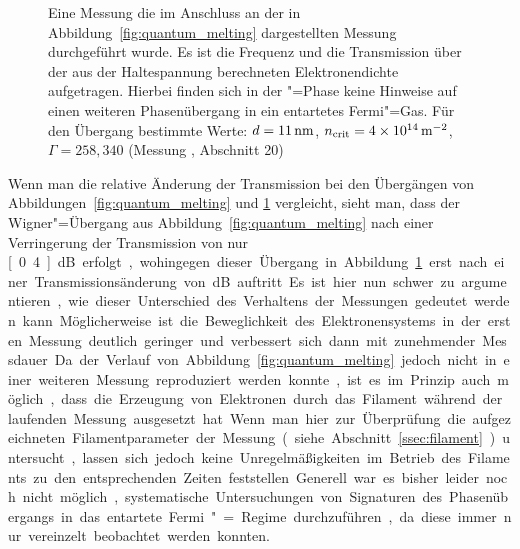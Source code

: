 \begin{figure}[h!tbp]
    \hfill%
    \begin{minipage}[b]{\textwidth-\midwidth-\tabcolsep}
        \caption[Hohe Elektronendichten auf \SiO, Dichteverlauf]{Eine Messung die im Anschluss an der in Abbildung~\ref{fig:quantum_melting} dargestellten Messung durchgeführt wurde. Es ist die Frequenz und die Transmission über der aus der Haltespannung berechneten Elektronendichte aufgetragen. Hierbei finden sich in der "=Phase keine Hinweise auf einen weiteren Phasenübergang in ein entartetes Fermi"=Gas. Für den Übergang bestimmte Werte: $d=\unit[11]{nm}$, $n_\text{crit}=\unit[4\times10^{14}]{\Em}$, $\Gamma=258, 340$ (Messung , Abschnitt 20)}
        \label{fig:high_n_sio2}
    \end{minipage}
\end{figure}

Wenn man die relative Änderung der Transmission bei den Übergängen von Abbildungen~\ref{fig:quantum_melting} und \ref{fig:high_n_sio2} vergleicht, sieht man, dass der Wigner"=Übergang aus Abbildung~\ref{fig:quantum_melting} nach einer Verringerung der Transmission von nur \unit[0.4]{dB} erfolgt, wohingegen dieser Übergang in Abbildung~\ref{fig:high_n_sio2} erst nach einer Transmissionsänderung von \unit[2]{dB} auftritt. Es ist hier nun schwer zu argumentieren, wie dieser Unterschied des Verhaltens der Messungen gedeutet werden kann. Möglicherweise ist die Beweglichkeit des Elektronensystems in der ersten Messung deutlich geringer und verbessert sich dann mit zunehmender Messdauer. Da der Verlauf von Abbildung~\ref{fig:quantum_melting} jedoch nicht in einer weiteren Messung reproduziert werden konnte, ist es im Prinzip auch möglich, dass die Erzeugung von Elektronen durch das Filament während der laufenden Messung ausgesetzt hat. Wenn man hier zur Überprüfung die aufgezeichneten Filamentparameter der Messung (siehe Abschnitt~\ref{ssec:filament}) untersucht, lassen sich jedoch keine Unregelmäßigkeiten im Betrieb des Filaments zu den entsprechenden Zeiten feststellen. Generell war es bisher leider noch nicht möglich, systematische Untersuchungen von Signaturen des Phasenübergangs in das entartete Fermi"=Regime durchzuführen, da diese immer nur vereinzelt beobachtet werden konnten.

